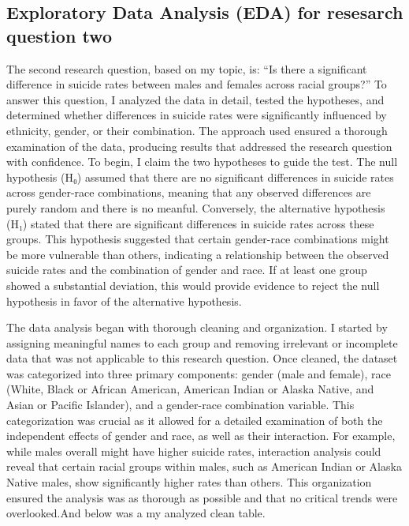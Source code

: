 \documentclass[
  letterpaper,
  DIV=11,
  numbers=noendperiod]{scrartcl}
\begin{document}
\subsection{Exploratory Data Analysis (EDA) for resesarch question
two}\label{exploratory-data-analysis-eda-for-resesarch-question-two}

The second research question, based on my topic, is: ``Is there a
significant difference in suicide rates between males and females across
racial groups?'' To answer this question, I analyzed the data in detail,
tested the hypotheses, and determined whether differences in suicide
rates were significantly influenced by ethnicity, gender, or their
combination. The approach used ensured a thorough examination of the
data, producing results that addressed the research question with
confidence. To begin, I claim the two hypotheses to guide the test. The
null hypothesis (H₀) assumed that there are no significant differences
in suicide rates across gender-race combinations, meaning that any
observed differences are purely random and there is no meanful.
Conversely, the alternative hypothesis (H₁) stated that there are
significant differences in suicide rates across these groups. This
hypothesis suggested that certain gender-race combinations might be more
vulnerable than others, indicating a relationship between the observed
suicide rates and the combination of gender and race. If at least one
group showed a substantial deviation, this would provide evidence to
reject the null hypothesis in favor of the alternative hypothesis.

The data analysis began with thorough cleaning and organization. I
started by assigning meaningful names to each group and removing
irrelevant or incomplete data that was not applicable to this research
question. Once cleaned, the dataset was categorized into three primary
components: gender (male and female), race (White, Black or African
American, American Indian or Alaska Native, and Asian or Pacific
Islander), and a gender-race combination variable. This categorization
was crucial as it allowed for a detailed examination of both the
independent effects of gender and race, as well as their interaction.
For example, while males overall might have higher suicide rates,
interaction analysis could reveal that certain racial groups within
males, such as American Indian or Alaska Native males, show
significantly higher rates than others. This organization ensured the
analysis was as thorough as possible and that no critical trends were
overlooked.And below was a my analyzed clean table.
\end{document}
